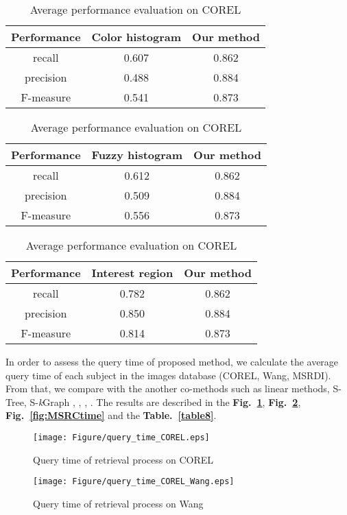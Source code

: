 \documentclass{amcs}
\begin{document}
\begin{table}[!b]
 \centering
 \caption{Average performance evaluation on COREL}
 \label{table5}
 \begin{tabular}{|c|c|c|}
   \hline
   Performance & Color histogram  & Our method\\\hline\hline
   recall 		& 0.607 & 0.862 \\
   precision 	& 0.488 & 0.884 \\
   F-measure 	& 0.541 & 0.873 \\\hline
 \end{tabular}
\end{table}

\begin{table}[!b]
 \centering
 \caption{Average performance evaluation on COREL}
 \label{table6}
 \begin{tabular}{|c|c|c|}
   \hline
   Performance & Fuzzy histogram  & Our method\\\hline\hline
   recall 		& 0.612 & 0.862 \\
   precision 	& 0.509 & 0.884 \\
   F-measure 	& 0.556 & 0.873 \\\hline
 \end{tabular}
\end{table}

\begin{table}[!b]
 \centering
 \caption{Average performance evaluation on COREL}
 \label{table7}
 \begin{tabular}{|c|c|c|}
   \hline
   Performance & Interest region  & Our method\\\hline\hline
   recall 		& 0.782 & 0.862 \\
   precision 	& 0.850 & 0.884 \\
   F-measure 	& 0.814 & 0.873 \\\hline
 \end{tabular}
\end{table}

In order to assess the query time of proposed method, we calculate the average query time of each subject in the images database (COREL, Wang, MSRDI). From that, we compare with the another co-methods such as linear methods, S-Tree, S-\textit{k}Graph \cite{Thanh:2013}, \cite{Thanh:2014}, \cite{Thanh:2014a}, \cite{Thanh:2014b}. The results are described in the \textbf{Fig.~\ref{fig:CORELtime}}, \textbf{Fig.~\ref{fig:Wangtime}}, \textbf{Fig.~\ref{fig:MSRCtime}} and the \textbf{Table.~\ref{table8}}.

\begin{figure}[!ht]
	\centering
		\texttt{[image: Figure/query\_time\_COREL.eps]}
		\caption{Query time of retrieval process on COREL}
		\label{fig:CORELtime}
\end{figure}
\begin{figure}[!ht]
	\centering
		\texttt{[image: Figure/query\_time\_COREL\_Wang.eps]}
		\caption{Query time of retrieval process on Wang}
		\label{fig:Wangtime}
\end{figure}
\end{document}
